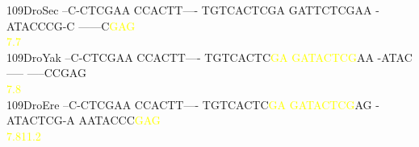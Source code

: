 \documentclass[11pt,twoside,reqno,a4paper]{article}
\begin{document}
{109\hspace*{1\charwidth}DroSec	--C-CTCGAA	CCACTT----	TGTCACTCGA	GATTCTCGAA	-ATACCCG-C	------C\textcolor{yellow}{G}\textcolor{yellow}{A}\textcolor{yellow}{G}	\\
\hspace*{4\charwidth}\hspace*{7\charwidth}\hspace*{1\charwidth}\hspace*{1\charwidth}\hspace*{1\charwidth}\hspace*{1\charwidth}\hspace*{1\charwidth}\hspace*{57\charwidth}\textcolor{yellow}{7.7}\hspace*{1\charwidth}\\
109\hspace*{1\charwidth}DroYak	--C-CTCGAA	CCACTT----	TGTCACTC\textcolor{yellow}{G}\textcolor{yellow}{A}	\textcolor{yellow}{G}\textcolor{yellow}{A}\textcolor{yellow}{T}\textcolor{yellow}{A}\textcolor{yellow}{C}\textcolor{yellow}{T}\textcolor{yellow}{C}\textcolor{yellow}{G}AA	-ATAC-----	-----CCGAG	\\
\hspace*{4\charwidth}\hspace*{7\charwidth}\hspace*{1\charwidth}\hspace*{1\charwidth}\hspace*{28\charwidth}\textcolor{yellow}{7.8}\hspace*{1\charwidth}\hspace*{1\charwidth}\hspace*{1\charwidth}\hspace*{1\charwidth}\\
109\hspace*{1\charwidth}DroEre	--C-CTCGAA	CCACTT----	TGTCACTC\textcolor{yellow}{G}\textcolor{yellow}{A}	\textcolor{yellow}{G}\textcolor{yellow}{A}\textcolor{yellow}{T}\textcolor{yellow}{A}\textcolor{yellow}{C}\textcolor{yellow}{T}\textcolor{yellow}{C}\textcolor{yellow}{G}AG	-ATACTCG-A	AATACCC\textcolor{yellow}{G}\textcolor{yellow}{A}\textcolor{yellow}{G}	\\
\hspace*{4\charwidth}\hspace*{7\charwidth}\hspace*{1\charwidth}\hspace*{1\charwidth}\hspace*{28\charwidth}\textcolor{yellow}{7.8}\hspace*{1\charwidth}\hspace*{1\charwidth}\hspace*{1\charwidth}\hspace*{26\charwidth}\textcolor{yellow}{11.2}\hspace*{1\charwidth}\\
}
\end{document}
